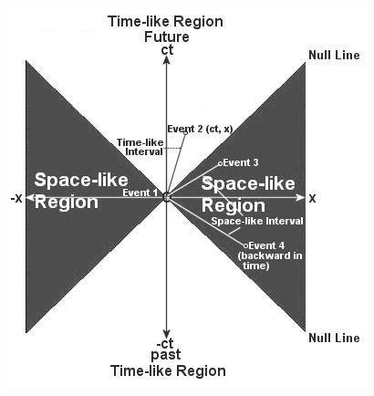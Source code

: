 \documentclass[12pt,a4paper]{article}
\renewcommand{\=}[1]{\stackrel{#1}{=}}
\theoremstyle{definition}
\theoremstyle{remark}
\begin{document}
\begin{center}
\begin{minipage}[t]{.5\linewidth}
\includegraphics[width=.9\linewidth]{pic/minkowski.jpg}



\end{minipage}
\end{center}


\end{document}
